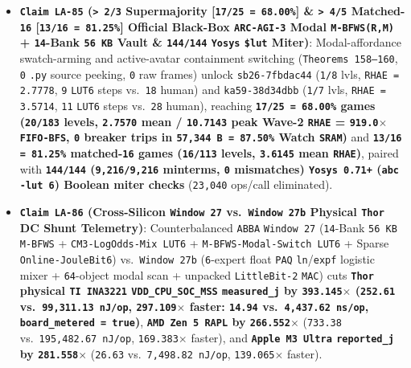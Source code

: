\documentclass[10pt]{article}
\begin{document}
\begin{itemize}
  \item \textbf{\texttt{Claim LA-85} (\texttt{> 2/3} Supermajority [\texttt{17/25 = 68.00\%}] \& \texttt{> 4/5} Matched-\texttt{16} [\texttt{13/16 = 81.25\%}] Official Black-Box \texttt{ARC-AGI-3} Modal \texttt{M-BFWS(R,M)} + \texttt{14}-Bank \texttt{56 KB} Vault \& \texttt{144/144} \texttt{Yosys} \texttt{\$lut} Miter)}: Modal-affordance swatch-arming and active-avatar containment switching (\texttt{Theorems 158--160}, \texttt{0} \texttt{.py} source peeking, \texttt{0} raw frames) unlock \texttt{sb26-7fbdac44} (\texttt{1/8} lvls, \texttt{RHAE = 2.7778}, \texttt{9} \texttt{LUT6} steps vs.\ \texttt{18} human) and \texttt{ka59-38d34dbb} (\texttt{1/7} lvls, \texttt{RHAE = 3.5714}, \texttt{11} \texttt{LUT6} steps vs.\ \texttt{28} human), reaching \textbf{\texttt{17/25 = 68.00\%} games (\texttt{20/183} levels, \texttt{2.7570} mean / \texttt{10.7143} peak Wave-2 \texttt{RHAE} = \texttt{919.0$\times$} \texttt{FIFO-BFS}, \texttt{0} breaker trips in \texttt{57,344 B = 87.50\%} Watch \texttt{SRAM})} and \textbf{\texttt{13/16 = 81.25\%} matched-\texttt{16} games (\texttt{16/113} levels, \texttt{3.6145} mean \texttt{RHAE})}, paired with \textbf{\texttt{144/144} (\texttt{9,216/9,216} minterms, \texttt{0} mismatches) \texttt{Yosys 0.71+} (\texttt{abc -lut 6}) Boolean miter checks} (\texttt{23,040} ops/call eliminated).
  \item \textbf{\texttt{Claim LA-86} (Cross-Silicon \texttt{Window 27} vs.\ \texttt{Window 27b} Physical \texttt{Thor} DC Shunt Telemetry)}: Counterbalanced \texttt{ABBA} \texttt{Window 27} (\texttt{14}-Bank \texttt{56 KB} \texttt{M-BFWS} + \texttt{CM3-LogOdds-Mix LUT6} + \texttt{M-BFWS-Modal-Switch LUT6} + Sparse \texttt{Online-JouleBit6}) vs.\ \texttt{Window 27b} (\texttt{6}-expert float \texttt{PAQ} \texttt{ln}/\texttt{expf} logistic mixer + \texttt{64}-object modal scan + unpacked \texttt{LittleBit-2} \texttt{MAC}) cuts \textbf{\texttt{Thor} physical \texttt{TI INA3221} \texttt{VDD\_CPU\_SOC\_MSS} \texttt{measured\_j} by \texttt{393.145$\times$} (\texttt{252.61} vs.\ \texttt{99,311.13 nJ/op}, \texttt{297.109$\times$} faster: \texttt{14.94} vs.\ \texttt{4,437.62 ns/op}, \texttt{board\_metered = true})}, \textbf{\texttt{AMD Zen 5 RAPL} by \texttt{266.552$\times$}} (\texttt{733.38} vs.\ \texttt{195,482.67 nJ/op}, \texttt{169.383$\times$} faster), and \textbf{\texttt{Apple M3 Ultra} \texttt{reported\_j} by \texttt{281.558$\times$}} (\texttt{26.63} vs.\ \texttt{7,498.82 nJ/op}, \texttt{139.065$\times$} faster).

\end{itemize}
\end{document}
